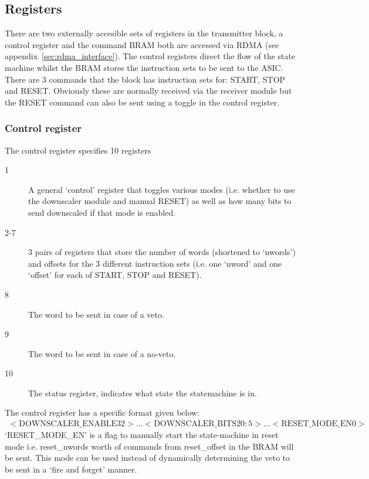 \documentclass[]{article}
\begin{document}
    \subsection{Registers} %
    \label{sub:tx_registers}
    There are two externally accesible sets of registers in the transmitter block, a control register and the command BRAM both are accessed via RDMA (see appendix~\ref{sec:rdma_interface}). The control registers direct the flow of the state machine whilst the BRAM stores the instruction sets to be sent to the ASIC. There are 3 commands that the block has instruction sets for: START, STOP and RESET. Obviously these are normally received via the receiver module but the RESET command can also be sent using a toggle in the control register.
    \subsubsection{Control register} %
    \label{sub:ctrl_reg}
    The control register specifies 10 registers
    \begin{description}
        \item[1] A general `control' register that toggles various modes (i.e. whether to use the downscaler module and manual RESET) as well as how many bits to send downscaled if that mode is enabled.
        \item[2-7] 3 pairs of registers that store the number of words (shortened to `nwords') and offsets for the 3 different instruction sets (i.e. one `nword' and one `offset' for each of START, STOP and RESET).
        \item[8] The word to be sent in case of a veto.
        \item[9] The word to be sent in case of a no-veto.
        \item[10] The status register, indicates what state the statemachine is in.
    \end{description}
    The control register has a specific format given below:
    \begin{align} \label{fmt:control_reg}
        <\text{DOWNSCALER\_ENABLE} 32>\ldots<\text{DOWNSCALER\_BITS} 20:5>\ldots<\text{RESET\_MODE\_EN} 0>
    \end{align}
    `RESET\_MODE\_EN' is a flag to manually start the state-machine in reset mode i.e. reset\_nwords worth of commands from reset\_offset in the BRAM will be sent. This mode can be used instead of dynamically determining the veto to be sent in a `fire and forget' manner.
\end{document}
